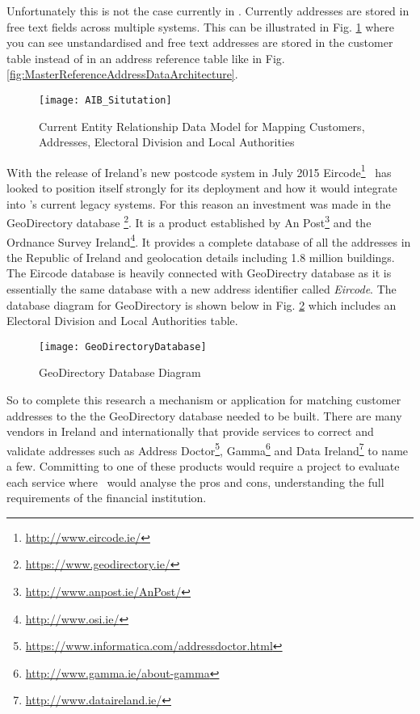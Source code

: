 Unfortunately this is not the case currently in \subjectname. Currently addresses are stored in free text fields across multiple systems. This can be illustrated in Fig. \ref{fig:AIB_Situtation} where you can see unstandardised and free text addresses are stored in the customer table instead of in an address reference table like in Fig. \ref{fig:MasterReferenceAddressDataArchitecture}.

\begin{figure}[H]
	\texttt{[image: AIB\_Situtation]}
	\caption{Current Entity Relationship Data Model for Mapping Customers, Addresses, Electoral Division and Local Authorities}
	\label{fig:AIB_Situtation}
\end{figure}

With the release of Ireland's new postcode system in July 2015 Eircode\footnote{\url{http://www.eircode.ie/}} \subjectname\ has looked to position itself strongly for its deployment and how it would integrate into \subjectname's current legacy systems. For this reason an investment was made in the GeoDirectory database \footnote{\url{https://www.geodirectory.ie/}}. It is a product established by An Post\footnote{\url{http://www.anpost.ie/AnPost/}} and the Ordnance Survey Ireland\footnote{\url{http://www.osi.ie/}}. It provides a complete database of all the addresses in the Republic of Ireland and geolocation details including 1.8 million buildings. The Eircode database is heavily connected with GeoDirectry database as it is essentially the same database with a new address identifier called \textit{Eircode}. The database diagram for GeoDirectory is shown below in Fig. \ref{fig:GeoDirectoryDatabase} which includes an Electoral Division and Local Authorities table.

\begin{figure}[H]
	\texttt{[image: GeoDirectoryDatabase]}
	\caption{GeoDirectory Database Diagram}
	\label{fig:GeoDirectoryDatabase}
\end{figure}

So to complete this research a mechanism or application for matching customer addresses to the the GeoDirectory database needed to be built. There are many vendors in Ireland and internationally that provide services to correct and validate addresses such as Address Doctor\footnote{\url{https://www.informatica.com/addressdoctor.html}}, Gamma\footnote{\url{http://www.gamma.ie/about-gamma}} and Data Ireland\footnote{\url{http://www.dataireland.ie/}} to name a few. Committing to one of these products would require a project to evaluate each service where \subjectname\ would analyse the pros and cons, understanding the full requirements of the financial institution.


